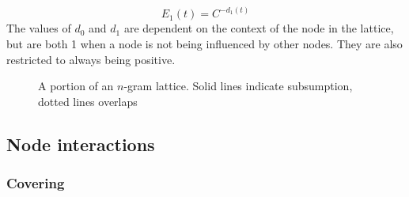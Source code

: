 \documentclass[11pt,letterpaper]{article}
\begin{document}
\begin{displaymath}
E_1(t) = C^{-d_1(t)}
\end{displaymath}
The values of $d_0$ and $d_1$ are dependent on the context of the node in the lattice, but are both 1 when a node is not being influenced by other nodes. They are also restricted to always being positive.


\begin{figure}[!tb]
\caption{A portion of an $n$-gram lattice. Solid lines indicate subsumption, dotted lines overlaps}
\label{fig:example}
\end{figure}

\subsection{Node interactions}

\subsubsection{Covering}
\end{document}
